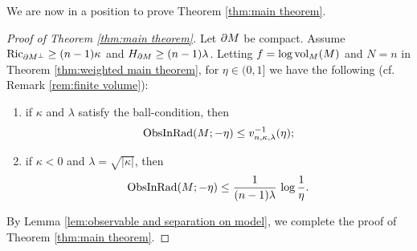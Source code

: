 We are now in a position to prove Theorem \ref{thm:main theorem}.

\begin{proof}[Proof of Theorem \ref{thm:main theorem}]
Let $\partial M$ be compact.
Assume $\operatorname{Ric}_{\partial M^{\perp}}\geq (n-1)\kappa$ and $H_{\partial M}\geq (n-1)\lambda$.
Letting $f=\log \operatorname{vol}_{M}(M)$ and $N=n$ in Theorem \ref{thm:weighted main theorem},
for $\eta \in (0,1]$
we have the following (cf. Remark \ref{rem:finite volume}):
\begin{enumerate}
\item if $\kappa$ and $\lambda$ satisfy the ball-condition,
         then
         \begin{equation*}
         \operatorname{ObsInRad}(M;-\eta) \leq v^{-1}_{n,\kappa,\lambda}(\eta);
         \end{equation*}
\item if $\kappa<0$ and $\lambda=\sqrt{\vert \kappa \vert}$,
         then
         \begin{equation*}
         \operatorname{ObsInRad}(M;-\eta) \leq \frac{1}{(n-1)\lambda}\,\log \frac{1}{\eta}.
         \end{equation*}
\end{enumerate}
By Lemma \ref{lem:observable and separation on model},
we complete the proof of Theorem \ref{thm:main theorem}.
\end{proof}